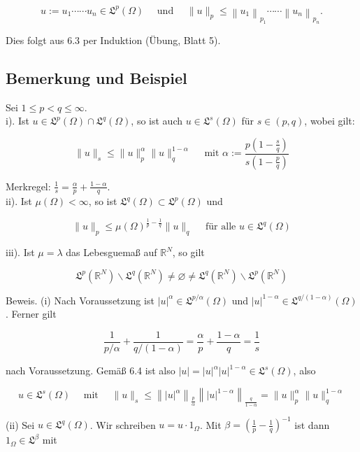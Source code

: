 \documentclass[10pt, letterpaper]{article}
\begin{document}
$$
u:=u_{1} \cdots \cdots u_{n} \in \mathfrak{L}^{p}(\Omega) \quad \text { und } \quad\|u\|_{p} \leq\left\|u_{1}\right\|_{p_{1}} \cdots \cdots\left\|u_{n}\right\|_{p_{n}} .
$$

Dies folgt aus 6.3 per Induktion (Übung, Blatt 5).

\subsection*{Bemerkung und Beispiel}
Sei $1 \leq p<q \leq \infty$.\\
i). Ist $u \in \mathfrak{L}^{p}(\Omega) \cap \mathfrak{L}^{q}(\Omega)$, so ist auch $u \in \mathfrak{L}^{s}(\Omega)$ für $s \in(p, q)$, wobei gilt:

$$
\|u\|_{s} \leq\|u\|_{p}^{\alpha}\|u\|_{q}^{1-\alpha} \quad \text { mit } \alpha:=\frac{p\left(1-\frac{s}{q}\right)}{s\left(1-\frac{p}{q}\right)}
$$

Merkregel: $\frac{1}{s}=\frac{\alpha}{p}+\frac{1-\alpha}{q}$.\\
ii). Ist $\mu(\Omega)<\infty$, so ist $\mathfrak{L}^{q}(\Omega) \subset \mathfrak{L}^{p}(\Omega)$ und

$$
\|u\|_{p} \leq \mu(\Omega)^{\frac{1}{p}-\frac{1}{q}}\|u\|_{q} \quad \text { für alle } u \in \mathfrak{L}^{q}(\Omega)
$$

iii). Ist $\mu=\lambda$ das Lebesguemaß auf $\mathbb{R}^{N}$, so gilt

$$
\mathfrak{L}^{p}\left(\mathbb{R}^{N}\right) \backslash \mathfrak{L}^{q}\left(\mathbb{R}^{N}\right) \neq \varnothing \neq \mathfrak{L}^{q}\left(\mathbb{R}^{N}\right) \backslash \mathfrak{L}^{p}\left(\mathbb{R}^{N}\right)
$$

Beweis. (i) Nach Voraussetzung ist $|u|^{\alpha} \in \mathfrak{L}^{p / \alpha}(\Omega)$ und $|u|^{1-\alpha} \in \mathfrak{L}^{q /(1-\alpha)}(\Omega)$. Ferner gilt

$$
\frac{1}{p / \alpha}+\frac{1}{q /(1-\alpha)}=\frac{\alpha}{p}+\frac{1-\alpha}{q}=\frac{1}{s}
$$

nach Voraussetzung. Gemäß 6.4 ist also $|u|=|u|^{\alpha}|u|^{1-\alpha} \in \mathfrak{L}^{s}(\Omega)$, also

$$
u \in \mathfrak{L}^{s}(\Omega) \quad \text { mit } \quad\|u\|_{s} \leq\left\||u|^{\alpha}\right\|_{\frac{p}{\alpha}}\left\||u|^{1-\alpha}\right\|_{\frac{q}{1-\alpha}}=\|u\|_{p}^{\alpha}\|u\|_{q}^{1-\alpha}
$$

(ii) Sei $u \in \mathfrak{L}^{q}(\Omega)$. Wir schreiben $u=u \cdot 1_{\Omega}$. Mit $\beta=\left(\frac{1}{p}-\frac{1}{q}\right)^{-1}$ ist dann $1_{\Omega} \in \mathfrak{L}^{\beta}$ mit
\end{document}
